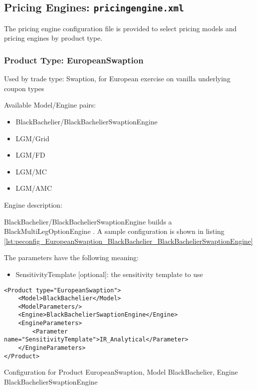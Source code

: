 \subsection{Pricing Engines: {\tt pricingengine.xml}}
\label{sec:configuration_pricingengines}

The pricing engine configuration file is provided to select pricing models and pricing engines by product type.

\subsubsection{Product Type: EuropeanSwaption}

Used by trade type: Swaption, for European exercise on vanilla underlying coupon types

Available Model/Engine pairs:

\begin{itemize}
\item BlackBachelier/BlackBachelierSwaptionEngine
\item LGM/Grid
\item LGM/FD
\item LGM/MC
\item LGM/AMC
\end{itemize}

Engine description:

BlackBachelier/BlackBachelierSwaptionEngine builds a BlackMultiLegOptionEngine . A sample configuration is shown in
listing \ref{lst:peconfig_EuropeanSwaption_BlackBachelier_BlackBachelierSwaptionEngine}

The parameters have the following meaning:

\begin{itemize}
\item SensitivityTemplate [optional]: the sensitivity template to use 
\end{itemize}

\begin{longlisting}
\begin{verbatim}
<Product type="EuropeanSwaption">
    <Model>BlackBachelier</Model>
    <ModelParameters/>
    <Engine>BlackBachelierSwaptionEngine</Engine>
    <EngineParameters>
        <Parameter name="SensitivityTemplate">IR_Analytical</Parameter>
    </EngineParameters>
</Product>
\end{verbatim}
\caption{Configuration for Product EuropeanSwaption, Model BlackBachelier, Engine BlackBachelierSwaptionEngine}
\label{lst:peconfig_EuropeanSwaption_BlackBachelier_BlackBachelierSwaptionEngine}
\end{longlisting}

